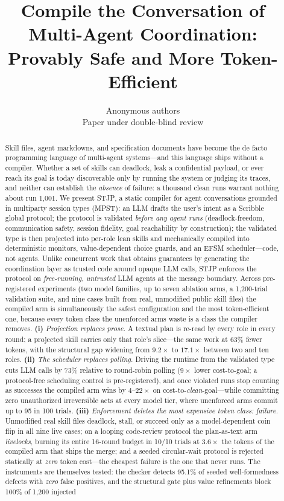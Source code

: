 \documentclass{article}
\title{\bf Compile the Conversation of Multi-Agent Coordination:\\ Provably Safe and More Token-Efficient}
\author{Anonymous authors\\ \small Paper under double-blind review}
\date{}
\newcommand{\stjp}{\textsc{STJP}}
\begin{document}
\maketitle

\begin{abstract}
Skill files, agent markdowns, and specification documents have become the de facto programming language of multi-agent systems---and this language ships without a compiler. Whether a set of skills can deadlock, leak a confidential payload, or ever reach its goal is today discoverable only by running the system or judging its traces, and neither can establish the \emph{absence} of failure: a thousand clean runs warrant nothing about run 1{,}001. We present \stjp{}, a static compiler for agent conversations grounded in multiparty session types (MPST): an LLM drafts the user's intent as a Scribble global protocol; the protocol is validated \emph{before any agent runs} (deadlock-freedom, communication safety, session fidelity, goal reachability by construction); the validated type is then projected into per-role lean skills and mechanically compiled into deterministic monitors, value-dependent choice guards, and an EFSM scheduler---code, not agents. Unlike concurrent work that obtains guarantees by generating the coordination layer as trusted code around opaque LLM calls, \stjp{} enforces the protocol on \emph{free-running, untrusted} LLM agents at the message boundary. Across pre-registered experiments (two model families, up to seven ablation arms, a 1{,}200-trial validation suite, and nine cases built from real, unmodified public skill files) the compiled arm is simultaneously the safest configuration and the most token-efficient one, because every token class the unenforced arms waste is a class the compiler removes. \textbf{(i)} \emph{Projection replaces prose.} A textual plan is re-read by every role in every round; a projected skill carries only that role's slice---the same work at 63\% fewer tokens, with the structural gap widening from $9.2\times$ to $17.1\times$ between two and ten roles. \textbf{(ii)} \emph{The scheduler replaces polling.} Driving the runtime from the validated type cuts LLM calls by 73\% relative to round-robin polling ($9\times$ lower cost-to-goal; a protocol-free scheduling control is pre-registered), and once violated runs stop counting as successes the compiled arm wins by $4$--$22\times$ on cost-to-\emph{clean}-goal---while committing zero unauthorized irreversible acts at every model tier, where unenforced arms commit up to 95 in 100 trials. \textbf{(iii)} \emph{Enforcement deletes the most expensive token class: failure.} Unmodified real skill files deadlock, stall, or succeed only as a model-dependent coin flip in all nine live cases; on a looping code-review protocol the plan-as-text arm \emph{livelocks}, burning its entire 16-round budget in 10/10 trials at $3.6\times$ the tokens of the compiled arm that ships the merge; and a seeded circular-wait protocol is rejected statically at \emph{zero} token cost---the cheapest failure is the one that never runs. The instruments are themselves tested: the checker detects 95.1\% of seeded well-formedness defects with \emph{zero} false positives, and the structural gate plus value refinements block 100\% of 1{,}200 injected 
\end{abstract}
\end{document}

